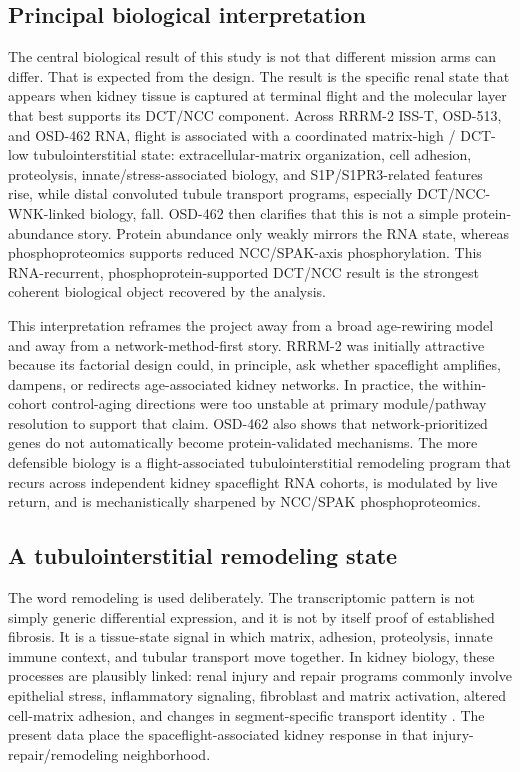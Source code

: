\documentclass[11pt]{article}
\begin{document}
\subsection{Principal biological interpretation}

The central biological result of this study is not that different mission arms can differ. That is expected from the design. The result is the specific renal state that appears when kidney tissue is captured at terminal flight and the molecular layer that best supports its DCT/NCC component. Across RRRM-2 ISS-T, OSD-513, and OSD-462 RNA, flight is associated with a coordinated matrix-high / DCT-low tubulointerstitial state: extracellular-matrix organization, cell adhesion, proteolysis, innate/stress-associated biology, and S1P/S1PR3-related features rise, while distal convoluted tubule transport programs, especially DCT/NCC-WNK-linked biology, fall. OSD-462 then clarifies that this is not a simple protein-abundance story. Protein abundance only weakly mirrors the RNA state, whereas phosphoproteomics supports reduced NCC/SPAK-axis phosphorylation. This RNA-recurrent, phosphoprotein-supported DCT/NCC result is the strongest coherent biological object recovered by the analysis.

This interpretation reframes the project away from a broad age-rewiring model and away from a network-method-first story. RRRM-2 was initially attractive because its factorial design could, in principle, ask whether spaceflight amplifies, dampens, or redirects age-associated kidney networks. In practice, the within-cohort control-aging directions were too unstable at primary module/pathway resolution to support that claim. OSD-462 also shows that network-prioritized genes do not automatically become protein-validated mechanisms. The more defensible biology is a flight-associated tubulointerstitial remodeling program that recurs across independent kidney spaceflight RNA cohorts, is modulated by live return, and is mechanistically sharpened by NCC/SPAK phosphoproteomics.

\subsection{A tubulointerstitial remodeling state}

The word remodeling is used deliberately. The transcriptomic pattern is not simply generic differential expression, and it is not by itself proof of established fibrosis. It is a tissue-state signal in which matrix, adhesion, proteolysis, innate immune context, and tubular transport move together. In kidney biology, these processes are plausibly linked: renal injury and repair programs commonly involve epithelial stress, inflammatory signaling, fibroblast and matrix activation, altered cell-matrix adhesion, and changes in segment-specific transport identity \citep{liu2011fibrosis,natneph2024fibrosis,jci2024fibrosis,chavula2022cadherin}. The present data place the spaceflight-associated kidney response in that injury-repair/remodeling neighborhood.
\end{document}
